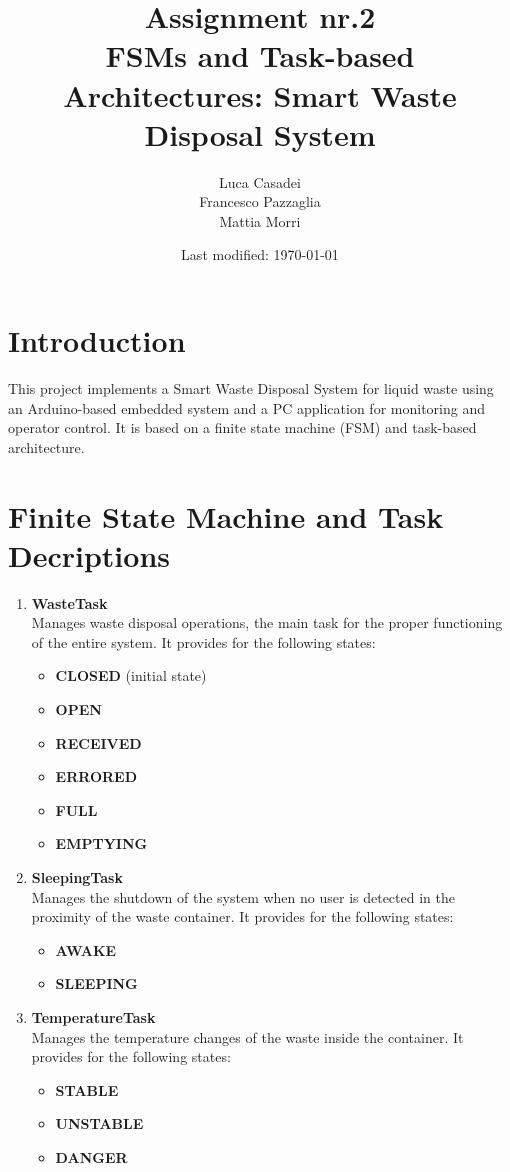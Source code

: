 \documentclass[a4paper]{article}
\author{Luca Casadei\\Francesco Pazzaglia\\Mattia Morri}
\date{Last modified: \today}
\title{\textbf{Assignment nr.2\\FSMs and Task-based Architectures: Smart Waste Disposal System}}
\begin{document}
	\maketitle
	\tableofcontents
	\section{Introduction}
	This project implements a Smart Waste Disposal System for liquid waste using an Arduino-based embedded system and a PC application for monitoring and operator control. It is based on a finite state machine (FSM) and task-based architecture.
	
	\section{Finite State Machine and Task Decriptions}
	\begin{enumerate}
		\item \textbf{WasteTask}\\
		Manages waste disposal operations, the main task for the proper functioning of the entire system. It provides for the following states:
		\begin{itemize}
			\item \textbf{CLOSED} (initial state)
			\item \textbf{OPEN}
			\item \textbf{RECEIVED}
			\item \textbf{ERRORED}
			\item \textbf{FULL}
			\item \textbf{EMPTYING}
		\end{itemize}
		
		\item \textbf{SleepingTask}\\
		Manages the shutdown of the system when no user is detected in the proximity of the waste container. It provides for the following states:
		\begin{itemize}
			\item \textbf{AWAKE}
			\item \textbf{SLEEPING}
		\end{itemize}
		
		\item \textbf{TemperatureTask}\\
		Manages the temperature changes of the waste inside the container. It provides for the following states:
		\begin{itemize}
			\item \textbf{STABLE}
			\item \textbf{UNSTABLE}
			\item \textbf{DANGER}
		\end{itemize}

	\end{enumerate}
\end{document}
